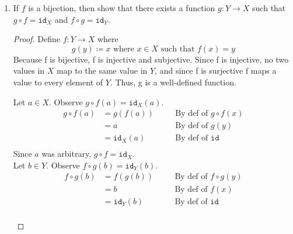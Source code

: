\documentclass{article}
\newcommand{\defeq}{\coloneqq}
\newcommand{\id}{\texttt{id}}
\begin{document}
\begin{enumerate}
\begin{enumerate}
\begin{proof}
\begin{align*}
                &\quad
                &\text{By def of } f \circ g(y)\\
              & = b
                &\quad
                &\text{By def of } f(x)\\
            & = \id_Y(b)
                &\quad
                &\text{By def of } \id\\
            \end{align*}
            Since $b$ was arbitrary, $f \circ g= \id_Y$.
        \end{proof}
\pagebreak
        \item
        If $f$ is a bijection, then show that there exists a function $g: Y \to X$ such that $g \circ f = \id_X$ and $f \circ g = \id_Y$.
        \begin{proof}
            Define $f: Y \to X$ where 
            \begin{equation*}
                g(y) \defeq x \text{ where } x \in X \text{ such that } f(x)=y
            \end{equation*}
            Because f is bijective, f is injective and subjective. Since f is injective, no two values in $X$ map to the same value in $Y$, and since f is surjective f maps a value to every element of $Y$. Thus, g is a well-defined function.
            \begin{multicols}{2}
            Let $a \in X$. Observe $g \circ f(a)= \id_X(a)$.
            \begin{align*}
            g \circ f(a)
              & = g(f(a))
                &\quad
                &\text{By def of } g \circ f(x)\\
              & = a
                &\quad
                &\text{By def of } g(y)\\
            & = \id_X(a)
                &\quad
                &\text{By def of } \id\\
            \end{align*}
            Since $a$ was arbitrary, $g \circ f= \id_X$.\\
            Let $b \in Y$. Observe $f \circ g(b)= \id_Y(b)$.
            \begin{align*}
            f \circ g(b)
              & = f(g(b))
                &\quad
                &\text{By def of } f \circ g(y)\\
              & = b
                &\quad
                &\text{By def of } f(x)\\
            & = \id_Y(b)
                &\quad
                &\text{By def of } \id\\

\end{align*}
\end{multicols}
\end{proof}
\end{enumerate}
\end{enumerate}
\end{document}
